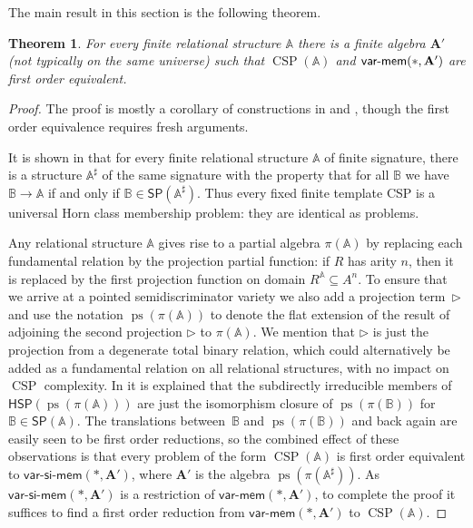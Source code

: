 \documentclass[reqno]{amsart}
\theoremstyle{plain}
\newtheorem{thm}{Theorem}[section]
\theoremstyle{definition}
\newcommand{\varmem}{\textsf{var-mem}}
\newcommand{\varsimem}{\textsf{var-si-mem}}
\newcommand{\ps}{\operatorname{ps}}
\newcommand{\CSP}{\operatorname{CSP}}
\newcommand{\up}[1]{\textup{#1}}
\newcommand{\tr}{\triangleright}
\begin{document}
The main result in this section is the following theorem.
\begin{thm}
For every finite relational structure $\mathbb{A}$ there is a finite algebra $\mathbf{A}'$ \up(not typically on the same universe\up) such that  $\CSP(\mathbb{A})$ and $\varmem(*,{\bf A}')$ are first order equivalent.
\end{thm}
\begin{proof}
The proof is mostly a corollary of constructions in \cite{jac:flat} and \cite{jactro13}, though the first order equivalence requires fresh arguments.  

It is shown in \cite[\S4]{jactro13} that for every finite relational structure $\mathbb{A}$ of finite signature, there is a structure $\mathbb{A}^\sharp$ of the same signature with the property that for all $\mathbb{B}$ we have $\mathbb{B}\rightarrow\mathbb{A}$ if and only if $\mathbb{B}\in\mathsf{SP}(\mathbb{A}^\sharp)$.  Thus every fixed finite template CSP is a universal Horn class membership problem: they are identical as problems.  

Any relational structure $\mathbb{A}$ gives rise to a partial algebra $\pi(\mathbb{A})$ by replacing each fundamental relation by the projection partial function: if $R$ has arity $n$, then it is replaced by the first projection function on domain  $R^\mathbb{A}\subseteq A^n$.  
To ensure that we arrive at a pointed semidiscriminator variety we also add a projection term~$\tr$ and use the notation $\ps(\pi(\mathbb{A}))$ to denote the flat extension of the result of adjoining the second projection $\tr$ to $\pi(\mathbb{A})$. 
We mention that $\tr$ is just the projection from a degenerate total binary relation, which could alternatively be added as a fundamental relation on all relational structures, with no impact on $\CSP$ complexity.
In \cite[\S7.1]{jac:flat} it is explained that the subdirectly irreducible members of $\mathsf{HSP}(\ps(\pi(\mathbb{A})))$ are just the isomorphism closure of $\ps(\pi(\mathbb{B}))$ for $\mathbb{B}\in\mathsf{SP}(\mathbb{A})$.  The translations between~$\mathbb{B}$ and $\ps(\pi(\mathbb{B}))$ and back again are easily seen to be first order reductions, 
so the combined effect of these observations is that every problem of the form $\CSP(\mathbb{A})$ is first order equivalent to 
$\varsimem(*,\mathbf{A}')$, where  $\mathbf{A}'$ is the algebra $\ps(\pi(\mathbb{A}^\sharp))$.  As $\varsimem(*,\mathbf{A}')$ is a restriction of $\varmem(*,\mathbf{A}')$, to complete the proof it suffices to find a first order reduction from $\varmem(*,\mathbf{A}')$ to $\CSP(\mathbb{A})$. 


\end{proof}
\end{document}
